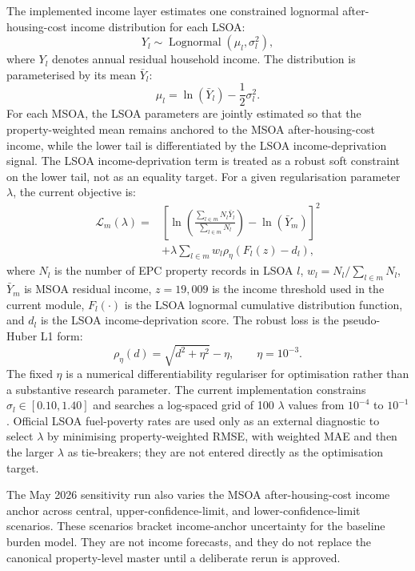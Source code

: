 The implemented income layer estimates one constrained lognormal after-housing-cost income distribution for each LSOA:
\begin{equation}
Y_l \sim \operatorname{Lognormal}(\mu_l,\sigma_l^2),
\end{equation}
where $Y_l$ denotes annual residual household income. The distribution is parameterised by its mean $\bar{Y}_l$:
\begin{equation}
\mu_l=\ln(\bar{Y}_l)-\frac{1}{2}\sigma_l^2 .
\end{equation}
For each MSOA, the LSOA parameters are jointly estimated so that the property-weighted mean remains anchored to the MSOA after-housing-cost income, while the lower tail is differentiated by the LSOA income-deprivation signal. The LSOA income-deprivation term is treated as a robust soft constraint on the lower tail, not as an equality target. For a given regularisation parameter $\lambda$, the current objective is:
\begin{equation}
\begin{split}
\mathcal{L}_m(\lambda)=&
\left[
\ln \left(\frac{\sum_{l \in m} N_l \bar{Y}_l}{\sum_{l \in m} N_l}\right)
-\ln(\bar{Y}_m)
\right]^2 \\
&+\lambda \sum_{l \in m} w_l
\rho_{\eta}\left(F_l(z)-d_l\right),
\end{split}
\end{equation}
where $N_l$ is the number of EPC property records in LSOA $l$, $w_l=N_l/\sum_{l \in m}N_l$, $\bar{Y}_m$ is MSOA residual income, $z=19{,}009$ is the income threshold used in the current module, $F_l(\cdot)$ is the LSOA lognormal cumulative distribution function, and $d_l$ is the LSOA income-deprivation score. The robust loss is the pseudo-Huber L1 form:
\begin{equation}
\rho_{\eta}(d)=\sqrt{d^2+\eta^2}-\eta,
\qquad \eta=10^{-3}.
\end{equation}
The fixed $\eta$ is a numerical differentiability regulariser for optimisation rather than a substantive research parameter. The current implementation constrains $\sigma_l \in [0.10,1.40]$ and searches a log-spaced grid of 100 $\lambda$ values from $10^{-4}$ to $10^{-1}$. Official LSOA fuel-poverty rates are used only as an external diagnostic to select $\lambda$ by minimising property-weighted RMSE, with weighted MAE and then the larger $\lambda$ as tie-breakers; they are not entered directly as the optimisation target.

The May 2026 sensitivity run also varies the MSOA after-housing-cost income anchor across central, upper-confidence-limit, and lower-confidence-limit scenarios. These scenarios bracket income-anchor uncertainty for the baseline burden model. They are not income forecasts, and they do not replace the canonical property-level master until a deliberate rerun is approved.

